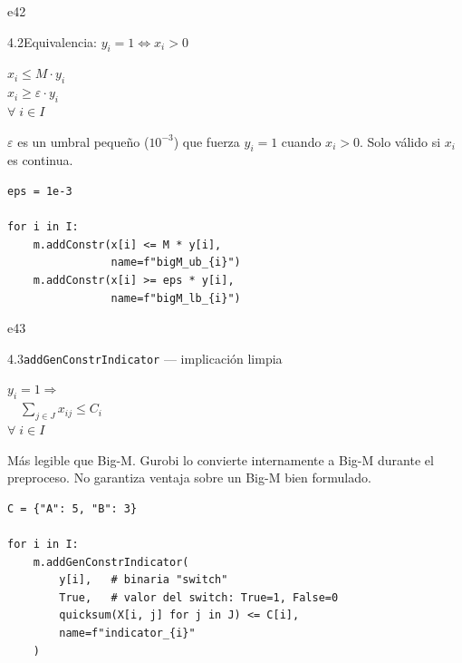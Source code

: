 \documentclass[10pt,a4paper]{article}
\newlength{\mathcolw}
\newlength{\codecolw}
\newcommand{\entryheader}[2][]{%
  \needspace{5cm}%
  \vspace{6pt}%
  \ifx\relax#1\relax\else\phantomsection\hypertarget{#1}{}\fi%
  \noindent%
  \begin{tcolorbox}[
    colback=subsecbg!18,
    colframe=subsecbg!45,
    sharp corners, boxrule=0.4pt,
    left=5pt, right=5pt, top=2pt, bottom=2pt,
    fontupper=\small\bfseries\sffamily,
  ]
  #2
  \end{tcolorbox}%
  \vspace{2pt}%
}
\newcommand{\py}[1]{\texttt{\small #1}}
\begin{document}
\vspace{4pt}

\entryheader[e42]{4.2\quad Equivalencia: $y_i = 1 \Leftrightarrow x_i > 0$}
\noindent
\begin{minipage}[t]{\mathcolw}
    \begin{tcolorbox}[mathbox]
        $x_i \leq M \cdot y_i$\\[2pt]
        $x_i \geq \varepsilon \cdot y_i$\\[6pt]
        $\forall\; i \in I$
    \end{tcolorbox}
    \vspace{2pt}
    \begin{tcolorbox}[notebox]
        $\varepsilon$ es un umbral peque\~no ($10^{-3}$) que fuerza $y_i = 1$ cuando $x_i > 0$. Solo v\'alido si $x_i$ es continua.
    \end{tcolorbox}
\end{minipage}\hspace{0.02\textwidth}%
\begin{minipage}[t]{\codecolw}
    \begin{lstlisting}[style=gurobipy]
eps = 1e-3

for i in I:
    m.addConstr(x[i] <= M * y[i],
                name=f"bigM_ub_{i}")
    m.addConstr(x[i] >= eps * y[i],
                name=f"bigM_lb_{i}")
\end{lstlisting}
\end{minipage}

\vspace{4pt}

\entryheader[e43]{4.3\quad \py{addGenConstrIndicator} --- implicaci\'on limpia}
\noindent
\begin{minipage}[t]{\mathcolw}
    \begin{tcolorbox}[mathbox]
        $y_i = 1 \Rightarrow$\\[2pt]
        $\quad\displaystyle\sum_{j \in J} x_{ij} \leq C_i$\\[6pt]
        $\forall\; i \in I$
    \end{tcolorbox}
    \vspace{2pt}
    \begin{tcolorbox}[notebox]
        M\'as legible que Big-M. Gurobi lo convierte internamente a Big-M durante el preproceso. No garantiza ventaja sobre un Big-M bien formulado.
    \end{tcolorbox}
\end{minipage}\hspace{0.02\textwidth}%
\begin{minipage}[t]{\codecolw}
    \begin{lstlisting}[style=gurobipy]
C = {"A": 5, "B": 3}

for i in I:
    m.addGenConstrIndicator(
        y[i],   # binaria "switch"
        True,   # valor del switch: True=1, False=0
        quicksum(X[i, j] for j in J) <= C[i],
        name=f"indicator_{i}"
    )
\end{lstlisting}
\end{minipage}
\end{document}
